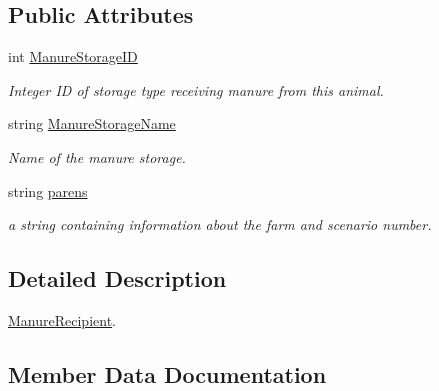 \subsection*{Public Attributes}
\begin{DoxyCompactItemize}
\item 
\mbox{\label{structlivestock_1_1_manure_recipient_a994ca499b2863c95705832269c31a4c0}} 
int \mbox{\hyperlink{structlivestock_1_1_manure_recipient_a994ca499b2863c95705832269c31a4c0}{Manure\+Storage\+ID}}
\begin{DoxyCompactList}\small\item\em Integer ID of storage type receiving manure from this animal. \end{DoxyCompactList}\item 
\mbox{\label{structlivestock_1_1_manure_recipient_a7a2d6c5743a5b9ab2686c43a3127042e}} 
string \mbox{\hyperlink{structlivestock_1_1_manure_recipient_a7a2d6c5743a5b9ab2686c43a3127042e}{Manure\+Storage\+Name}}
\begin{DoxyCompactList}\small\item\em Name of the manure storage. \end{DoxyCompactList}\item 
string \mbox{\hyperlink{structlivestock_1_1_manure_recipient_adb66d99bb1b3cf89215d89acca36d3e2}{parens}}
\begin{DoxyCompactList}\small\item\em a string containing information about the farm and scenario number. \end{DoxyCompactList}\end{DoxyCompactItemize}


\subsection{Detailed Description}
\mbox{\hyperlink{structlivestock_1_1_manure_recipient}{Manure\+Recipient}}. 

\subsection{Member Data Documentation}
\mbox{\label{structlivestock_1_1_manure_recipient_adb66d99bb1b3cf89215d89acca36d3e2}} 
